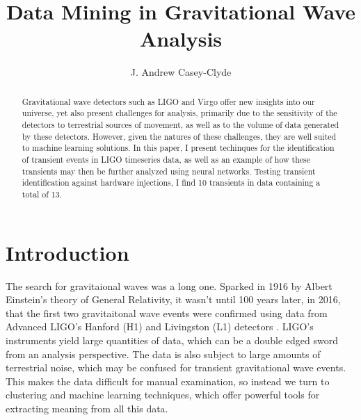\documentclass{article}
\begin{document}

\title{Data Mining in Gravitational Wave Analysis}
\author{J. Andrew Casey-Clyde}
\maketitle





\begin{abstract}
Gravitational wave detectors such as LIGO and Virgo offer new insights into our universe, yet also present challenges for analysis, primarily due to the sensitivity of the detectors to terrestrial sources of movement, as well as to the volume of data generated by these detectors. However, given the natures of these challenges, they are well suited to machine learning solutions. In this paper, I present techinques for the identification of transient events in LIGO timeseries data, as well as an example of how these transients may then be further analyzed using neural networks. Testing transient identification against hardware injections, I find 10 transients in data containing a total of 13.
\end{abstract}
\section{Introduction}
The search for gravitaional waves was a long one. Sparked in 1916 by Albert Einstein's theory of General Relativity, it wasn't until 100 years later, in 2016, that the first two gravitaitonal wave events were confirmed using data from Advanced LIGO's Hanford (H1) and Livingston (L1) detectors\citep{TheLIGOScientificCollaboration2016} \citep{Abbott2016}. LIGO's instruments yield large quantities of data, which can be a double edged sword from an analysis perspective. The data is also subject to large amounts of terrestrial noise, which may be confused for transient gravitational wave events. This makes the data difficult for manual examination, so instead we turn to clustering and machine learning techniques, which offer powerful tools for extracting meaning from all this data.
\end{document}
